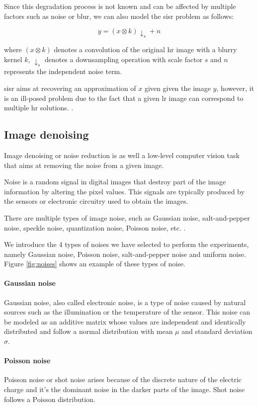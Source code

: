 Since this degradation process is not known and can be affected by multiple factors such as noise or blur, we can also model the \gls{sisr} problem as follows:

$$y = (x\otimes k)\downarrow_s + n$$

where $(x\otimes k)$ denotes a convolution of the original \gls{hr} image with a blurry kernel $k$, $\downarrow_s$ denotes a downsampling operation with scale factor $s$ and $n$ represents the independent noise term.

\gls{sisr} aims at recovering an approximation of $x$ given given the image $y$, however, it is an ill-posed problem due to the fact that a given \gls{lr} image can correspond to multiple \gls{hr} solutions. \cite{DBLP:DEEPSISR}.

\subsection{Image denoising}
Image denoising or noise reduction is as well a low-level computer vision task that aims at removing the noise from a given image. 

Noise is a random signal in digital images that destroy part of the image information by altering the pixel values. This signals are typically produced by the sensors or electronic circuitry used to obtain the images.

There are multiple types of image noise, such as Gaussian noise, salt-and-pepper noise, speckle noise, quantization noise, Poisson noise, etc. \cite{NOISE}.

We introduce the 4 types of noises we have selected to perform the experiments, namely Gaussian noise, Poisson noise, salt-and-pepper noise and uniform noise. Figure \ref{fig:noises} shows an example of these types of noise.

\paragraph{Gaussian noise}
Gaussian noise, also called electronic noise, is a type of noise caused by natural sources such as the illumination or the temperature of the sensor. This noise can be modeled as an additive matrix whose values are independent and identically distributed and follow a normal distribution with mean $\mu$ and standard deviation $\sigma$.

\paragraph{Poisson noise}
Poisson noise or shot noise arises because of the discrete nature of the electric charge and it's the dominant noise in the darker parts of the image. Shot noise follows a Poisson distribution.

